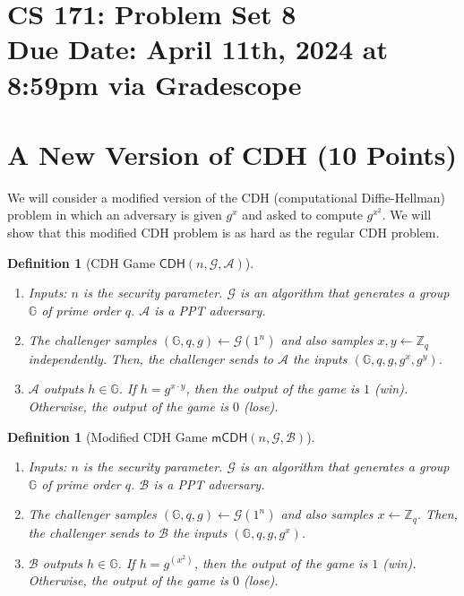 \documentclass[11pt]{article}
\newtheorem{definition}[theorem]{Definition}
\numberwithin{equation}{section}
\newcommand{\A}{\mathcal{A}}
\newcommand{\B}{\mathcal{B}}
\newcommand{\G}{\mathcal{G}}
\newcommand{\GG}{\mathbb{G}}
\newcommand{\ZZ}{\mathbb{Z}}
\newcommand{\duedate}{April 11th, 2024 at 8:59pm via Gradescope}
\begin{document}
\section*{CS 171: Problem Set 8\\ {\small Due Date: \duedate} }

\section{A New Version of CDH (10 Points)}
We will consider a modified version of the CDH (computational Diffie-Hellman) problem in which an adversary is given $g^x$ and asked to compute $g^{x^2}$. We will show that this modified CDH problem is as hard as the regular CDH problem.

\begin{definition}[CDH Game $\mathsf{CDH}(n, \G, \A)$]
$ $
\begin{enumerate}
    \item Inputs: $n$ is the security parameter. $\G$ is an algorithm that generates a group $\GG$ of prime order $q$. $\A$ is a PPT adversary.
    \item The challenger samples $(\GG, q, g) \leftarrow \G(1^n)$ and also samples $x, y \leftarrow \ZZ_q$ independently. Then, the challenger sends to $\A$ the inputs $(\GG, q, g, g^x, g^y)$.
    \item $\A$ outputs $h \in \GG$. If $h = g^{x \cdot y}$, then the output of the game is $1$ (win). Otherwise, the output of the game is $0$ (lose).
\end{enumerate}
\end{definition}

\begin{definition}[Modified CDH Game $\mathsf{mCDH}(n, \G, \B)$]
$ $
\begin{enumerate}
    \item Inputs: $n$ is the security parameter. $\G$ is an algorithm that generates a group $\GG$ of prime order $q$. $\B$ is a PPT adversary.
    \item The challenger samples $(\GG, q, g) \leftarrow \G(1^n)$ and also samples $x \leftarrow \ZZ_q$. Then, the challenger sends to $\B$ the inputs $(\GG, q, g, g^x)$.
    \item $\B$ outputs $h \in \GG$. If $h = g^{\left(x^2\right)}$, then the output of the game is $1$ (win). Otherwise, the output of the game is $0$ (lose).
\end{enumerate}
\end{definition}
\end{document}
